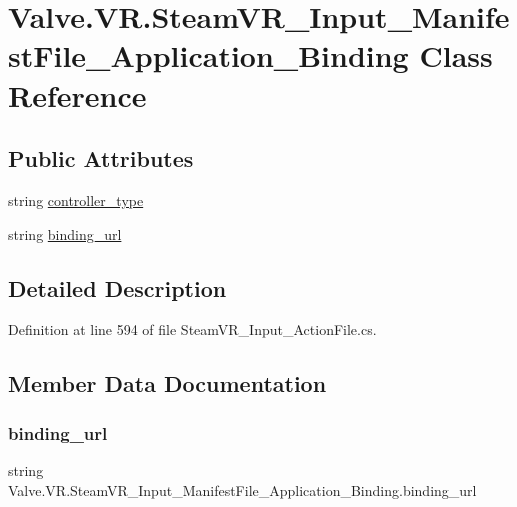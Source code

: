 \hypertarget{class_valve_1_1_v_r_1_1_steam_v_r___input___manifest_file___application___binding}{}\section{Valve.\+V\+R.\+Steam\+V\+R\+\_\+\+Input\+\_\+\+Manifest\+File\+\_\+\+Application\+\_\+\+Binding Class Reference}
\label{class_valve_1_1_v_r_1_1_steam_v_r___input___manifest_file___application___binding}
\subsection*{Public Attributes}
\begin{DoxyCompactItemize}
\item 
string \mbox{\hyperlink{class_valve_1_1_v_r_1_1_steam_v_r___input___manifest_file___application___binding_a7639ba36a1c79e202456d91f6fb6e621}{controller\+\_\+type}}
\item 
string \mbox{\hyperlink{class_valve_1_1_v_r_1_1_steam_v_r___input___manifest_file___application___binding_aafd7783e26d524dde9d56d2cb4fc162a}{binding\+\_\+url}}
\end{DoxyCompactItemize}


\subsection{Detailed Description}


Definition at line 594 of file Steam\+V\+R\+\_\+\+Input\+\_\+\+Action\+File.\+cs.



\subsection{Member Data Documentation}
\mbox{\label{class_valve_1_1_v_r_1_1_steam_v_r___input___manifest_file___application___binding_aafd7783e26d524dde9d56d2cb4fc162a}} 
\subsubsection{\texorpdfstring{binding\_url}{binding\_url}}
{\footnotesize\ttfamily string Valve.\+V\+R.\+Steam\+V\+R\+\_\+\+Input\+\_\+\+Manifest\+File\+\_\+\+Application\+\_\+\+Binding.\+binding\+\_\+url}



